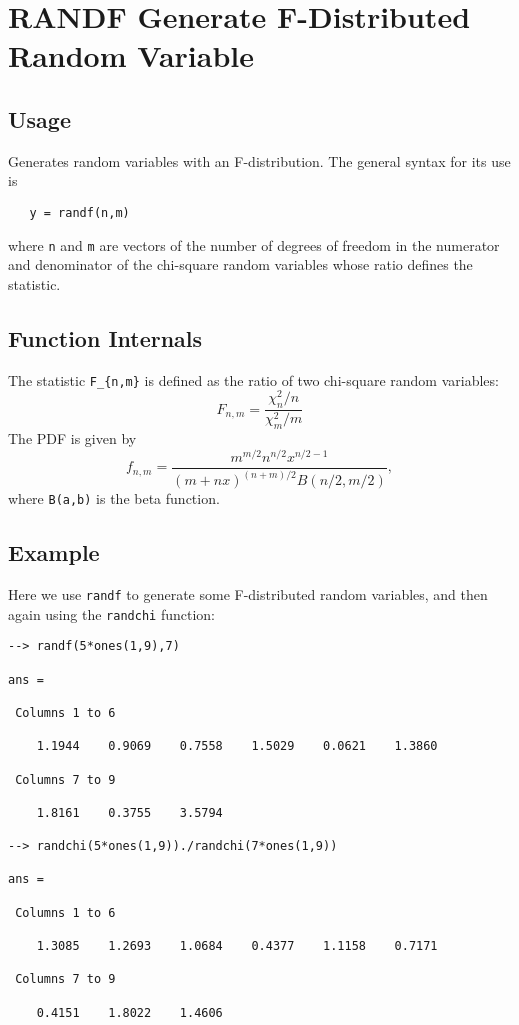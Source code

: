 \section{RANDF Generate F-Distributed Random Variable}

\subsection{Usage}

Generates random variables with an F-distribution.  The general
syntax for its use is
\begin{verbatim}
   y = randf(n,m)
\end{verbatim}
where \verb|n| and \verb|m| are vectors of the number of degrees of freedom
in the numerator and denominator of the chi-square random variables
whose ratio defines the statistic.
\subsection{Function Internals}

The statistic \verb|F_{n,m}| is defined as the ratio of two chi-square
random variables:
\[
  F_{n,m} = \frac{\chi_n^2/n}{\chi_m^2/m}
\]
The PDF is given by
\[
  f_{n,m} = \frac{m^{m/2}n^{n/2}x^{n/2-1}}{(m+nx)^{(n+m)/2}B(n/2,m/2)},
\]
where \verb|B(a,b)| is the beta function.
\subsection{Example}

Here we use \verb|randf| to generate some F-distributed random variables,
and then again using the \verb|randchi| function:
\begin{verbatim}
--> randf(5*ones(1,9),7)

ans = 

 Columns 1 to 6

    1.1944    0.9069    0.7558    1.5029    0.0621    1.3860 

 Columns 7 to 9

    1.8161    0.3755    3.5794 

--> randchi(5*ones(1,9))./randchi(7*ones(1,9))

ans = 

 Columns 1 to 6

    1.3085    1.2693    1.0684    0.4377    1.1158    0.7171 

 Columns 7 to 9

    0.4151    1.8022    1.4606 
\end{verbatim}
